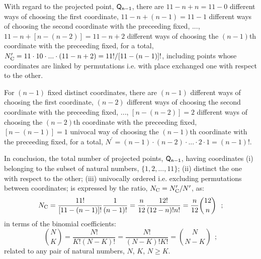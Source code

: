 \documentclass[12pt,a4paper]{article}
\begin{document}
%                      

With regard to the projected point, ${\sf Q_{n-1}}$, there are
$11-n+n=11-0$ different ways of choosing the first coordinate,
$11-n+(n-1)=11-1$ different ways of choosing the second coordinate
with the preceeding fixed, ..., $11-n+[n-(n-2)]=11-n+2$ different
ways of choosing the $(n-1)$th coordinate with the preceeding fixed,
for a total, $N_{\rm C}^\prime=11\cdot10\cdot...\cdot(11-n+2)=11!/
[11-(n-1)]!$, including points whose coordinates are linked by
permutations i.e. with place exchanged one with respect to the other.

For $(n-1)$ fixed distinct coordinates, there are $(n-1)$ different
ways of choosing the first coordinate, $(n-2)$ different ways of
choosing the second coordinate with the preceeding fixed, ...,
$[n-(n-2)]=2$ different ways of choosing the $(n-2)$th coordinate
with the preceeding fixed, $[n-(n-1)]=1$ univocal way of choosing
the $(n-1)$th coordinate with the preceeding fixed, for a total,
$N^\prime=(n-1)\cdot(n-2)\cdot...\cdot2\cdot1=(n-1)!$.

In conclusion, the total number of projected points, ${\sf Q_{n-1}}$,
having coordinates (i) belonging to the subset of natural numbers,
$\{1,2,...,11\}$; (ii) distinct the one with respect to the other;
(iii) univocally ordered i.e. excluding permutations between coordinates;
is expressed by the ratio, $N_{\rm C}=N_{\rm C}^\prime/N^\prime$, as:
\begin{equation}
\label{eq:NC}
N_{\rm C}=\frac{11!}{[11-(n-1)]!}\frac1{(n-1)!}=\frac n{12}\frac{12!}
{(12-n)!n!}=\frac n{12}{12 \choose n}~~;
\end{equation}
in terms of the binomial coefficients:
\begin{equation}
\label{eq:bico}
{N \choose K}=\frac{N!}{K!(N-K)!}=\frac{N!}{(N-K)!K!}={N \choose N-K}~~;
\end{equation}
related to any pair of natural numbers, $N$, $K$, $N\ge K$.
\end{document}
